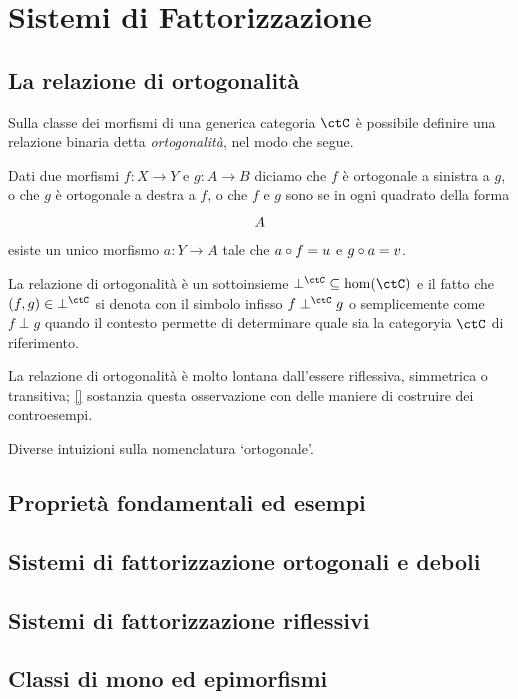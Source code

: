 \chapter{Sistemi di Fattorizzazione}
\section[Ortogonalità]{La relazione di ortogonalità}
Sulla classe dei morfismi di una generica categoria $\ctC$ è possibile definire una relazione binaria detta \emph{ortogonalità}, nel modo che segue.
\begin{definition}
        \AP Dati due morfismi $f : X\to Y$ e $g : A\to B$ diciamo che $f$ è ortogonale a sinistra a $g$, o che $g$ è ortogonale a destra a $f$, o che \(f\) e \(g\) sono  se in ogni quadrato della forma 
    \[
    \vcenter{\xymatrix{%
      A
    }}\]
        esiste un unico morfismo $a : Y\to A$ tale che $a\circ f=u$ e $g\circ a=v$.
\end{definition}
La relazione di ortogonalità è un sottoinsieme $\mathbin{\perp^\ctC} \subseteq \hom(\ctC)$ e il fatto che $(f,g)\in \mathbin{\perp^\ctC}$ si denota con il simbolo infisso $f\perp^\ctC g$ o semplicemente come $f\perp g$ quando il contesto permette di determinare quale sia la categoryia \(\ctC\) di riferimento. 

La relazione di ortogonalità è molto lontana dall'essere riflessiva, simmetrica o transitiva; \autoref{} sostanzia questa osservazione con delle maniere di costruire dei controesempi.
\begin{remark}\label{perche_ortogonale}
Diverse intuizioni sulla nomenclatura `ortogonale'.
\end{remark}

\section[Proprietà ed esempi]{Proprietà fondamentali ed esempi}
\section[Fattorizzazione]{Sistemi di fattorizzazione ortogonali e deboli}
\section[Riflessività]{Sistemi di fattorizzazione riflessivi}
\section[Mono ed epimorfismi]{Classi di mono ed epimorfismi}
